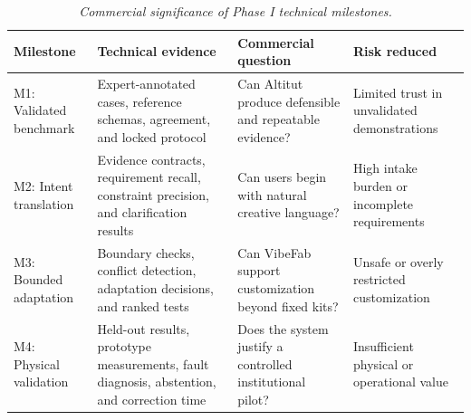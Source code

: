 \documentclass[11pt,letterpaper]{article}
\begin{document}
\vspace{-3pt}
\begin{table}[H]
\centering
\small
\begin{tabularx}{\textwidth}{
    P{0.14\textwidth}
    P{0.28\textwidth}
    Y
    P{0.22\textwidth}}
\toprule
\textbf{Milestone} &
\textbf{Technical evidence} &
\textbf{Commercial question} &
\textbf{Risk reduced} \\
\midrule

M1: Validated benchmark &
Expert-annotated cases, reference schemas, agreement, and locked protocol &
Can Altitut produce defensible and repeatable evidence? &
Limited trust in unvalidated demonstrations \\


M2: Intent translation &
Evidence contracts, requirement recall, constraint precision, and clarification results &
Can users begin with natural creative language? &
High intake burden or incomplete requirements \\


M3: Bounded adaptation &
Boundary checks, conflict detection, adaptation decisions, and ranked tests &
Can VibeFab support customization beyond fixed kits? &
Unsafe or overly restricted customization \\


M4: Physical validation &
Held-out results, prototype measurements, fault diagnosis, abstention, and correction time &
Does the system justify a controlled institutional pilot? &
Insufficient physical or operational value \\

\bottomrule
\end{tabularx}
\caption{\textit{Commercial significance of Phase I technical milestones.}}
\label{tab:milestone_commercial_readiness}
\end{table}
\vspace{-10pt}

\end{document}
